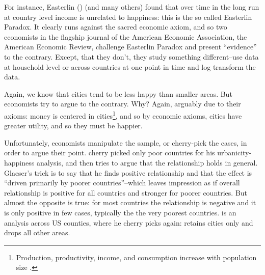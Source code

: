 \documentclass[10pt, letterpaper]{article}
\begin{document}
 For instance, Easterlin (\citeyear{easterlin15B,easterlin10B})  (and many others)  found that over
 time in the long run at country level  income  is unrelated to happiness: this
 is the so called Easterlin Paradox. It clearly runs against the sacred economic
 axiom, and so two economists \citet{stevenson13} in the flagship journal of the
 American Economic Association, the American Economic Review, challenge
 Easterlin Paradox and present ``evidence'' to the contrary. Except, that they
 don't, they study something different--use data at household level or across countries
 at one point in time and log transform the data. 

Again, we know that cities tend to be less happy than smaller areas. But
economists try to argue to the contrary. Why? Again, arguably due to their
axioms: money is centered in cities\footnote{Production, productivity,
income, and consumption increase with population size \cite{glaeser11C,glaeser07,glaeser01,rosenthal02,rosenthal03,rosenthal08}.}, and so by economic axioms, cities have
greater utility, and so they must be happier. 

Unfortunately, economists manipulate the sample, or cherry-pick the cases, in
order to argue their point. %
 \citet{glaeser11} cherry picked only poor countries for his
 urbanicity-happiness analysis, and then tries to argue that the relationship
 holds in general.
%
 Glaeser's trick is to say
that he finds positive relationship and that the effect is ``driven primarily by
poorer countries''--which leaves impression as if overall relationship is
positive for all countries and stronger for poorer countries. But
almost the opposite is true: for most countries the relationship is negative and it
is only positive in few cases, typically the the very poorest countries.
%
%
\cite{glaeser14} is an analysis across US counties, where he cherry picks again:
retains cities only and
drops all other areas. %
\end{document}
